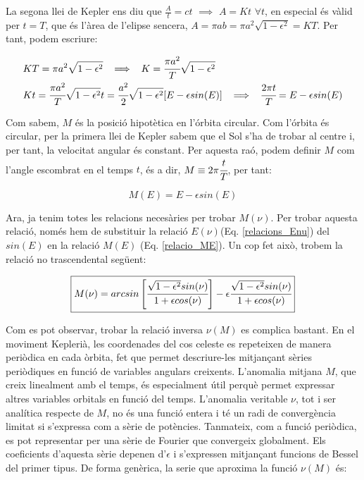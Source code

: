 \documentclass[a4paper, 11pt]{article}
\begin{document}
\noindent La segona llei de Kepler ens diu que $\frac{A}{t} = ct$ $\implies$ $A = Kt$ $\forall t$, en especial és vàlid per $t=T$, que és l'àrea de l'elipse sencera, $A = \pi ab = \pi a^2 \sqrt{1-\epsilon^2} = KT$. Per tant, podem escriure:

\begin{align*}
    &KT = \pi a^2 \sqrt{1-\epsilon^2} \hspace{2mm} \implies \hspace{2mm} K = \cfrac{\pi a^2}{T} \sqrt{1-\epsilon^2} \\
    &Kt = \cfrac{\pi a^2}{T} \sqrt{1-\epsilon^2} t = \cfrac{a^2}{2} \sqrt{1-\epsilon^2} [E - \epsilon sin(E)] \hspace{2mm} \implies \hspace{2mm} \cfrac{2\pi t}{T} = E - \epsilon sin(E) \\
\end{align*}

\noindent Com sabem, $M$ és la posició hipotètica en l'órbita circular. Com l'órbita és circular, per la primera llei de Kepler sabem que el Sol s'ha de trobar al centre i, per tant, la velocitat angular és constant. Per aquesta raó, podem definir $M$ com l'angle escombrat en el temps $t$, és a dir, $M \equiv 2\pi \cfrac{t}{T}$, per tant:

\begin{equation} \label{relacio_ME}
    \boxed{M(E) = E - \epsilon sin(E)}
\end{equation}
\vspace{2mm}

\noindent Ara, ja tenim totes les relacions necesàries per trobar $M(\nu)$. Per trobar aquesta relació, només hem de substituir la relació $E(\nu)$(Eq. \ref{relacions_Enu}) del $sin(E)$ en la relació $M(E)$ (Eq. \ref{relacio_ME}). Un cop fet això, trobem la relació no trascendental següent:

\vspace{2mm}
\begin{equation} \label{relacio_Mnu}
    \boxed{ M(\nu) = arcsin \left[ \cfrac{\sqrt{1-\epsilon ^2} sin(\nu)}{1 + \epsilon cos(\nu)} \right] - \epsilon \cfrac{\sqrt{1-\epsilon ^2} sin(\nu)}{1 + \epsilon cos(\nu)} }
\end{equation}
\vspace{2mm}

\noindent Com es pot observar, trobar la relació inversa $\nu(M)$ es complica bastant. En el moviment Keplerià, les coordenades del cos celeste es repeteixen de manera periòdica en cada òrbita, fet que permet descriure-les mitjançant sèries periòdiques en funció de variables angulars creixents. L’anomalia mitjana $M$, que creix linealment amb el temps, és especialment útil perquè permet expressar altres variables orbitals en funció del temps. L’anomalia veritable $\nu$, tot i ser analítica respecte de $M$, no és una funció entera i té un radi de convergència limitat si s’expressa com a sèrie de potències. Tanmateix, com a funció periòdica, es pot representar per una sèrie de Fourier que convergeix globalment. Els coeficients d’aquesta sèrie depenen d'$\epsilon$ i s’expressen mitjançant funcions de Bessel del primer tipus. De forma genèrica, la serie que aproxima la funció $\nu(M)$ és:
\end{document}
